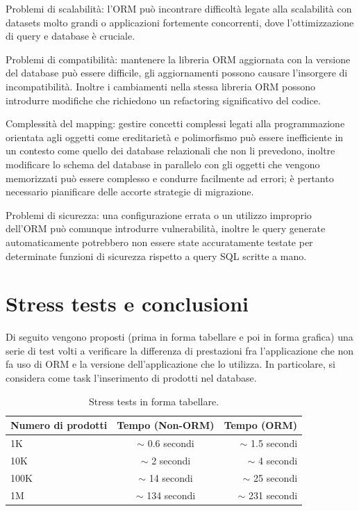 Problemi di scalabilità: l'ORM può incontrare difficoltà legate alla scalabilità con datasets molto grandi o applicazioni fortemente concorrenti, dove l'ottimizzazione di query e database è cruciale.

Problemi di compatibilità: mantenere la libreria ORM aggiornata con la versione del database può essere difficile, gli aggiornamenti possono causare l'insorgere di incompatibilità. Inoltre i cambiamenti nella stessa libreria ORM possono introdurre modifiche che richiedono un refactoring significativo del codice.

Complessità del mapping: gestire concetti complessi legati alla programmazione orientata agli oggetti come ereditarietà e polimorfismo può essere inefficiente in un contesto come quello dei database relazionali che non li prevedono, inoltre modificare lo schema del database in parallelo con gli oggetti che vengono memorizzati può essere complesso e condurre facilmente ad errori; è pertanto necessario pianificare delle accorte strategie di migrazione.

Problemi di sicurezza: una configurazione errata o un utilizzo improprio dell'ORM può comunque introdurre vulnerabilità, inoltre le query generate automaticamente potrebbero non essere state accuratamente testate per determinate funzioni di sicurezza rispetto a query SQL scritte a mano.

\newpage

\section{Stress tests e conclusioni}

Di seguito vengono proposti (prima in forma tabellare e poi in forma grafica) una serie di test volti a verificare la differenza di prestazioni fra l'applicazione che non fa uso di ORM e la versione dell'applicazione che lo utilizza. In particolare, si considera come task l'inserimento di prodotti nel database. 

\begin{table}[h!]
  \begin{center}
    \caption{Stress tests in forma tabellare.}
    \begin{tabular}{l|c|r} %
      \textbf{Numero di prodotti} & \textbf{Tempo (Non-ORM)} & \textbf{Tempo (ORM)}\\
      \hline
      1K & $\sim$ 0.6 secondi & $\sim$ 1.5 secondi\\
      10K & $\sim$ 2 secondi & $\sim$ 4 secondi\\
      100K & $\sim$ 14 secondi & $\sim$ 25 secondi\\
      1M & $\sim$ 134 secondi & $\sim$ 231 secondi\\
    \end{tabular}
  \end{center}
\end{table}

